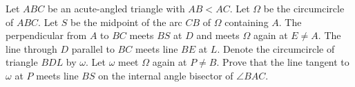 Let $ABC$ be an acute-angled triangle with $AB < AC$.
Let $\Omega$ be the circumcircle of $ABC$.
Let $S$ be the midpoint of the arc $CB$ of $\Omega$ containing $A$.
The perpendicular from $A$ to $BC$ meets $BS$ at $D$ and meets $\Omega$ again at $E \neq A$.
The line through $D$ parallel to $BC$ meets line $BE$ at $L$.
Denote the circumcircle of triangle $BDL$ by $\omega$.
Let $\omega$ meet $\Omega$ again at $P \neq B$.
Prove that the line tangent to $\omega$ at $P$ meets line $BS$
on the internal angle bisector of $\angle BAC$.